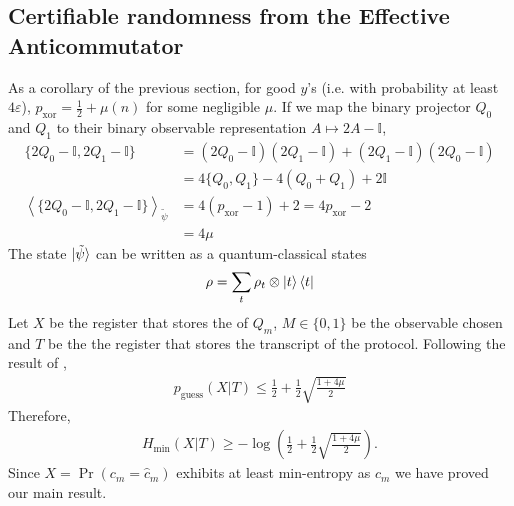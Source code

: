 \documentclass{article}
\begin{document}
\subsection{Certifiable randomness from the Effective Anticommutator}
As a corollary of the previous section, for good $y$'s (i.e. with probability at least $4\varepsilon$), $p_{\mathrm{xor}}=\frac{1}{2}+\mu(n)$ for some negligible $\mu$.
If we map the binary projector $Q_{0}$ and $Q_{1}$ to their binary observable representation $A\mapsto 2A - \mathbb{I}$,
\begin{align}
  \{2Q_{0}-\mathbb{I},2Q_{1}-\mathbb{I}\}&=(2Q_{0}-\mathbb{I})(2Q_{1}-\mathbb{I}) + (2Q_{1}-\mathbb{I})(2Q_{0}- \mathbb{I})\\&= 4\{Q_{0},Q_{1}\} - 4(Q_{0}+Q_{1}) + 2\mathbb{I}\\
    \left<\{2Q_{0}-\mathbb{I},2Q_{1}-\mathbb{I}\}\right>_{\tilde{\psi}}&= 4(p_{\mathrm{xor}} - 1) + 2 = 4p_{\mathrm{xor}}-2\\
    &=4\mu
    \end{align}
The state $\ket{\tilde{\psi}}$ can be written as a quantum-classical states
\begin{align}
    \rho = \sum_{t}\rho_{t} \otimes \ket{t}\bra{t}
\end{align} Let $X$ be the register that stores the of $Q_{m}$, $M\in\{0,1\}$ be the observable chosen and $T$ be the the register that stores the transcript of the protocol. Following the result of \cite{Kaniewski_2016},
\begin{align}
    p_{\mathrm{guess}}(X|T) \leq \frac{1}{2} + \frac{1}{2}\sqrt{\frac{1 + 4\mu}{2}}
\end{align}
Therefore, \begin{align}
    H_{\mathrm{min}}(X|T) \geq -\log\left(\frac{1}{2} + \frac{1}{2}\sqrt{\frac{1+4\mu}{2}}\right).
\end{align} Since $X=\Pr(c_{m}=\hat{c}_{m})$ exhibits at least min-entropy as $c_{m}$ we have proved our main result.
\end{document}
